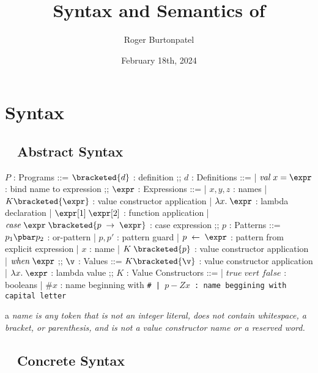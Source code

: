 \documentclass[]{article}
\title{Syntax and Semantics of {\PPlus}}
\author{Roger Burtonpatel}
\date{February 18th, 2024}
\begin{document}
\maketitle

\section{Syntax}

\subsection{{\PPlus}~ Abstract Syntax}

\bigskip

\begin{center}
    \begin{bnf}
    $P$ : \textsf{Programs} ::=
    $\bracketed{d}$ : definition
    ;;
    $d$ : \textsf{Definitions} ::=
    | $\mathit{val}\; x\; \tt{=}\; \expr$ : bind name to expression
    ;;
    $\expr$ : Expressions ::= 
    | $x, y, z$ : names
    | $K\bracketed{\expr}$ : value constructor application 
    | $\lambda x.\; \expr$ : lambda declaration  
    | $\expr[1]\; \expr[2]$ : function application 
    | $\mathit{case}\; \expr\; \bracketed{p\; \rightarrow\; \expr}$ : case expression 
    ;;
    $p$ : \textsf{Patterns} ::= $p_{1}\pbar p_{2}$ : or-pattern
    | $p, p'$ : pattern guard 
    | $p\; \leftarrow\; \expr$ : pattern from explicit expression  
    | $x$ : name 
    | $K\; \bracketed{p}$ : value constructor application 
    | $\mathit{when}\; \expr$
    ;;
    $\v$ : Values ::= $K\bracketed{\v}$ : value constructor application 
    | $\lambda x.\; \expr$ : lambda value 
    ;;
    $K$ : \textsf{Value Constructors} ::=
    | $\mathit{true}\; vert\; \mathit{false}$ : booleans
    | $\mathit{\#}x$ : name beginning with \tt{\#}
    | $\mathit{p-Z}x$ : name beggining with capital letter
    \end{bnf}
\end{center}


a \it{name} is any token that is not an integer literal, 
does not contain whitespace, a bracket, or parenthesis, 
and is not a value constructor name or a reserved word.

\vfilbreak

\subsection{{\PPlus}~ Concrete Syntax}
\end{document}
